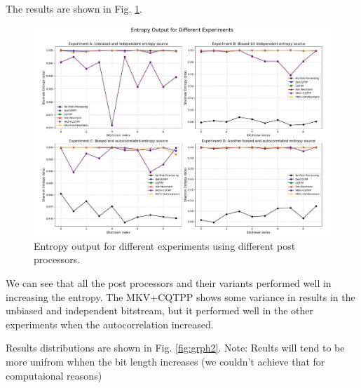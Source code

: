 The results are shown in Fig. \ref{fig:grph1}.

\begin{figure}[h!]
    \centering
    \includegraphics[width=\textwidth]{figures/download.pdf}
    \caption{Entropy output for different experiments using different post processors.}
    \label{fig:grph1}
\end{figure}

We can see that all the post processors and their variants performed well in increasing the entropy. The MKV+CQTPP shows some variance in results in the unbiased and independent bitstream, but it performed well in the other experiments when the autocorrelation increased.

Results distributions are shown in Fig. \ref{fig:grph2}.
Note: Reults will tend to be more unifrom whhen the bit length increases (we couldn't achieve that for computaional reasons)

